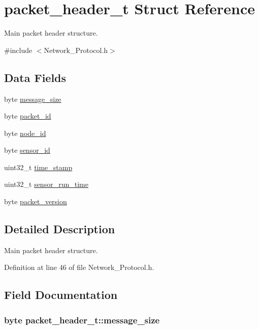 \hypertarget{structpacket__header__t}{\section{packet\-\_\-header\-\_\-t Struct Reference}
\label{structpacket__header__t}
}


Main packet header structure.  




{\ttfamily \#include $<$Network\-\_\-\-Protocol.\-h$>$}

\subsection*{Data Fields}
\begin{DoxyCompactItemize}
\item 
byte \hyperlink{structpacket__header__t_ab3542ece6f9327f92cdaf0d66646f86d}{message\-\_\-size}
\item 
byte \hyperlink{structpacket__header__t_a14363cfa4c23a3bb13c6c9c3991570e1}{packet\-\_\-id}
\item 
byte \hyperlink{structpacket__header__t_a1d15be605146754ef15fa9e106cf29a7}{node\-\_\-id}
\item 
byte \hyperlink{structpacket__header__t_a64e26ea2331dd13764e3e5e4173c9f1a}{sensor\-\_\-id}
\item 
uint32\-\_\-t \hyperlink{structpacket__header__t_a71efd9461faa2455de17c2fc5728fc06}{time\-\_\-stamp}
\item 
uint32\-\_\-t \hyperlink{structpacket__header__t_a7e0279ebfb2fa24ebab0891c974cba90}{sensor\-\_\-run\-\_\-time}
\item 
byte \hyperlink{structpacket__header__t_a950aab6d5a8dccd50d77b90b1df6b9a4}{packet\-\_\-version}
\end{DoxyCompactItemize}


\subsection{Detailed Description}
Main packet header structure. 

Definition at line 46 of file Network\-\_\-\-Protocol.\-h.



\subsection{Field Documentation}
\hypertarget{structpacket__header__t_ab3542ece6f9327f92cdaf0d66646f86d}{
\subsubsection[{message\-\_\-size}]{\setlength{\rightskip}{0pt plus 5cm}byte packet\-\_\-header\-\_\-t\-::message\-\_\-size}}\label{structpacket__header__t_ab3542ece6f9327f92cdaf0d66646f86d}


